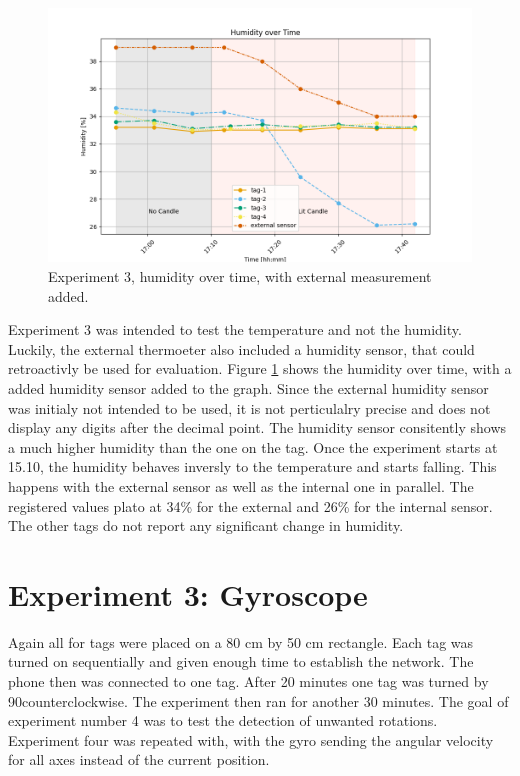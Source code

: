 \begin{figure}[ht!]
	\includegraphics[width=\linewidth]{graphics/exp/exp3_hum_plot_1.png}
	\caption{Experiment 3, humidity over time, with external measurement added.}
	\label{f:exp3_graphs_hum}
\end{figure}


Experiment 3 was intended to test the temperature and not the humidity.
Luckily, the external thermoeter also included a humidity sensor, that could retroactivly be used for evaluation.
Figure \ref{f:exp3_graphs_hum} shows the humidity over time, with a added humidity sensor added to the graph.
Since the external humidity sensor was initialy not intended to be used, it is not perticulalry precise and does not display any digits after the decimal point.
The humidity sensor consitently shows a much higher humidity than the one on the tag.
Once the experiment starts at 15.10, the humidity behaves inversly to the temperature and starts falling.
This happens with the external sensor as well as the internal one in parallel.
The registered values plato at 34\% for the external and 26\% for the internal sensor.
The other tags do not report any significant change in humidity.


\section{Experiment 3: Gyroscope}
\label{s:exp_3}
Again all for tags were placed on a 80 cm by 50 cm rectangle.
Each tag was turned on sequentially and given enough time to establish the network.
The phone then was connected to one tag.
After 20 minutes one tag was turned by 90\degree counterclockwise.
The experiment then ran for another 30 minutes.
The goal of experiment number 4 was to test the detection of unwanted rotations.
Experiment four was repeated with, with the gyro sending the angular velocity for all axes instead of the current position.

